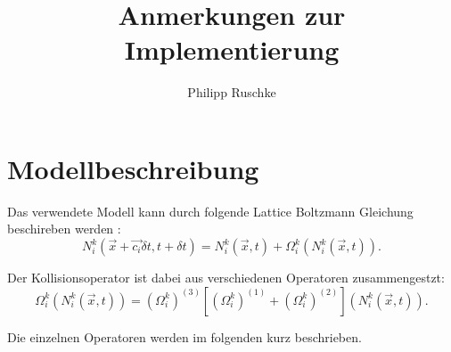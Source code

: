 \documentclass[a4paper,10pt]{scrreprt}
\title{Anmerkungen zur Implementierung}
\author{Philipp Ruschke}
\begin{document}
\maketitle
\chapter{Modellbeschreibung}
Das verwendete Modell kann durch folgende Lattice Boltzmann Gleichung beschireben werden \cite{Leclaire2011}:
\begin{equation}
N_i^k(\vec{x} + \vec{c_i} \delta t, t+\delta t) = N_i^k(\vec{x},t) + \Omega_i^k \left( N_i^k(\vec{x},t) \right).
\end{equation}

Der Kollisionsoperator ist dabei aus verschiedenen Operatoren zusammengestzt:
\begin{equation}
 \Omega_i^k  \left( N_i^k(\vec{x},t)\right) = (\Omega_i^k)^{(3)} \left[ (\Omega_i^k)^{(1)} + (\Omega_i^k)^{(2)} \right] \left( N_i^k(\vec{x},t)\right). 
\end{equation}

Die einzelnen Operatoren werden im folgenden kurz beschrieben.
\end{document}
